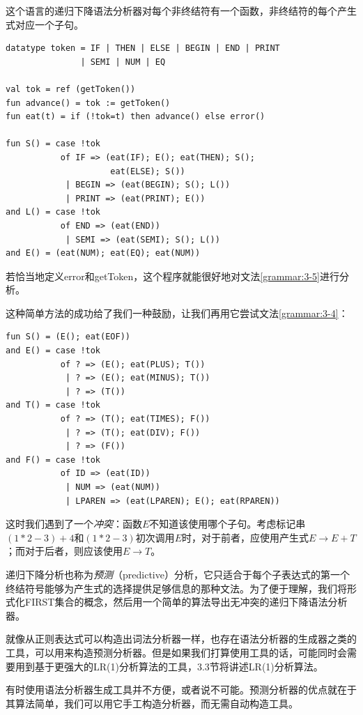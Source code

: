 \documentclass[cn,11pt,chinese]{elegantbook}
\begin{document}
这个语言的递归下降语法分析器对每个非终结符有一个函数，非终结符的每个产生式对应一个子句。

\begin{verbatim}
datatype token = IF | THEN | ELSE | BEGIN | END | PRINT
               | SEMI | NUM | EQ
               
val tok = ref (getToken())
fun advance() = tok := getToken()
fun eat(t) = if (!tok=t) then advance() else error()

fun S() = case !tok
           of IF => (eat(IF); E(); eat(THEN); S();
                     eat(ELSE); S())
            | BEGIN => (eat(BEGIN); S(); L())
            | PRINT => (eat(PRINT); E())
and L() = case !tok
           of END => (eat(END))
            | SEMI => (eat(SEMI); S(); L())
and E() = (eat(NUM); eat(EQ); eat(NUM))
\end{verbatim}

若恰当地定义error和getToken，这个程序就能很好地对文法\ref{grammar:3-5}进行分析。

这种简单方法的成功给了我们一种鼓励，让我们再用它尝试文法\ref{grammar:3-4}：

\begin{verbatim}
fun S() = (E(); eat(EOF))
and E() = case !tok
           of ? => (E(); eat(PLUS); T())
            | ? => (E(); eat(MINUS); T())
            | ? => (T())
and T() = case !tok
           of ? => (T(); eat(TIMES); F())
            | ? => (T(); eat(DIV); F())
            | ? => (F())
and F() = case !tok
           of ID => (eat(ID))
            | NUM => (eat(NUM))
            | LPAREN => (eat(LPAREN); E(); eat(RPAREN))  
\end{verbatim}

这时我们遇到了一个\textit{冲突}：函数$E$不知道该使用哪个子句。考虑标记串$(1*2-3)+4$和$(1*2-3)$初次调用$E$时，对于前者，应使用产生式$E \rightarrow E+T$；而对于后者，则应该使用$E \rightarrow T$。

递归下降分析也称为\textit{预测}（predictive）分析，它只适合于每个子表达式的第一个终结符号能够为产生式的选择提供足够信息的那种文法。为了便于理解，我们将形式化FIRST集合的概念，然后用一个简单的算法导出无冲突的递归下降语法分析器。

就像从正则表达式可以构造出词法分析器一样，也存在语法分析器的生成器之类的工具，可以用来构造预测分析器。但是如果我们打算使用工具的话，可能同时会需要用到基于更强大的LR(1)分析算法的工具，3.3节将讲述LR(1)分析算法。

有时使用语法分析器生成工具并不方便，或者说不可能。预测分析器的优点就在于其算法简单，我们可以用它手工构造分析器，而无需自动构造工具。
\end{document}
